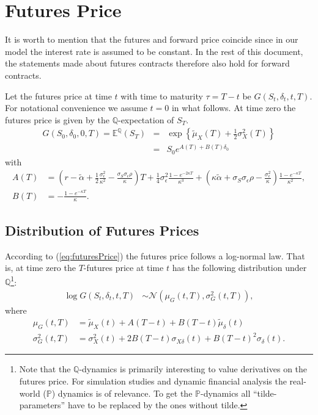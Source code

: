 \documentclass[a4paper,11pt]{article}
\newcommand{\sigmaS}{\sigma_S}
\newcommand{\sigmaE}{\sigma_\epsilon}
\begin{document}
\section{Futures Price}\label{sec:futures-price}
It is worth to mention that the futures and forward price coincide
since in our model the interest rate is assumed to be constant. In the
rest of this document, the statements made about futures contracts
therefore also hold for forward contracts.

Let the futures price at time $t$ with time to maturity $\tau = T - t$
be $G(S_t, \delta_t, t, T)$. For notational convenience we assume $t =
0$ in what follows. At time zero the futures price is given by the
$\mathbb{Q}$-expectation of $S_T$.
\begin{eqnarray}
  \label{eq:futuresPrice}
  G(S_0, \delta_0, 0, T) = \mathbb{E}^{\mathbb{Q}}(S_T) &=& \exp\left\{\tilde{\mu}_X(T) +
    \frac{1}{2}\sigma_X^2(T)\right\}\\
  &=& S_0 e^{A(T) + B(T)\delta_0}
\end{eqnarray}
with
\begin{align}
  A(T) &= \left(r - \tilde{\alpha} + \frac{1}{2}
    \frac{\sigmaE^2}{\kappa^2} - \frac{\sigmaS \sigmaE
      \rho}{\kappa}\right) T  + \frac{1}{4} \sigmaE^2 \frac{1 - e^{-
      2 \kappa T}}{\kappa^3} + \left( \kappa\tilde{\alpha} +
    \sigmaS \sigmaE \rho - \frac{\sigmaE^2}{\kappa} \right) \frac{1 -
    e^{-\kappa T}}{\kappa^2}\label{eq:A-futures},\\
  B(T) &= - \frac{1 - e^{-\kappa T}}{\kappa}\label{eq:B-futures}.
\end{align}
\subsection{Distribution of Futures Prices}
According to (\ref{eq:futuresPrice}) the futures price follows a
log-normal law. That is, at time zero the $T$-futures price at time
$t$ has the following distribution under $\mathbb{Q}$\footnote{Note
  that the $\mathbb{Q}$-dynamics is primarily interesting to value
  derivatives on the futures price. For simulation studies and dynamic
  financial analysis the real-world ($\mathbb{P}$) dynamics is of
  relevance. To get the $\mathbb{P}$-dynamics all ``tilde-parameters''
  have to be replaced by the ones without tilde.}:
\begin{align}
  \log{G(S_t, \delta_t, t,T)} &\sim \mathcal{N}\left(\mu_G(t, T),
    \sigma_G^2(t, T)\right),\label{eq:distrG}
\end{align}
where
\begin{align}
  \mu_G(t, T) &= \tilde{\mu}_X(t) + A(T-t) + B(T-t)\tilde{\mu}_\delta(t) \label{eq:muG} \\
  \sigma_G^2(t, T) &= \sigma_X^2(t) + 2 B(T-t)\sigma_{X\delta}(t) +
  B(T-t)^2 \sigma_\delta(t). \label{eq:varG}
\end{align}
\end{document}
